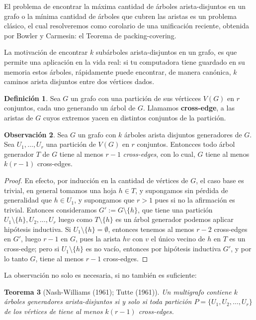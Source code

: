 \documentclass[12pt]{report}
\theoremstyle{plain}
\newtheorem{theorem}{Teorema}[section]
\theoremstyle{definition}
\newtheorem{definition}[theorem]{Definición}
\newtheorem{obs}[theorem]{Observación}
\begin{document}
El problema de encontrar la máxima cantidad de árboles arista-disjuntos en un grafo o la mínima cantidad de árboles que cubren las aristas es un problema clásico, el cual resolveremos como corolario de una unificación reciente, obtenida por Bowler y Carmesin: el Teorema de packing-covering.

La motivación de encontrar $k$ subárboles arista-disjuntos en un grafo, es que permite una aplicación en la vida real: si tu computadora tiene guardado en su memoria estos árboles, rápidamente puede encontrar, de manera canónica, $k$ caminos arista disjuntos entre dos vértices dados.

\begin{definition}
Sea $G$ un grafo con una partición de sus vérticces $V(G)$ en $r$ conjuntos, cada uno generando un árbol de $G$. Llamamos \textbf{cross-edge}, a las aristas de $G$ cuyos extremos yacen en distintos conjuntos de la partición.
\end{definition}

\begin{obs}
Sea $G$ un grafo con $k$ árboles arista disjuntos generadores de $G$. Sea $U_1, \ldots, U_r$ una partición de $V(G)$ en $r$ conjuntos. Entoncces todo árbol generador $T$ de $G$ tiene al menos $r-1$ \textit{cross-edges}, con lo cual, $G$ tiene al menos $k(r-1)$ cross-edges.
\end{obs}
\begin{proof}
En efecto, por inducción en la cantidad de vértices de $G$, el caso base es trivial, en general tomamos una hoja $h \in T$, y supongamos sin pérdida de generalidad que $h \in U_1$, y supongamos que $r >1$ pues si no la afirmación es trivial. Entonces consideramos $G' := G\setminus \{h\}$, que tiene una partición $U_1 \setminus \{h\}, U_2, \ldots, U_r$ luego como $T\setminus \{h\}$ es un árbol generador podemos aplicar hipótesis inductiva. Si $U_1 \setminus \{h\} = \emptyset$, entonces tenemos al menos $r-2$ cross-edges en $G'$, luego $r-1$ en $G$, pues la arista $hv$ con $v$ el único vecino de $h$ en $T$ es un cross-edge; pero si $U_1 \setminus \{h\}$ es no vacío, entonces por hipótesis inductiva $G'$, y por lo tanto $G$, tiene al menos $r-1$ cross-edges.
\end{proof}
La observación no solo es necesaria, si no también es suficiente:

\begin{theorem}[Nash-Williams (1961); Tutte (1961)]\label{th:Nash-williams y Tutte - todo multigrafo con $k$ arboles generadores arista disjuntos si y solo si toda particion tiene almenos k (P-1) elementos}
Un multigrafo contiene $k$ árboles generadores arista-disjuntos si y solo si toda partición $P = \{U_1,U_2,\ldots,U_r\}$ de los vértices de tiene al menos $k(r-1)$ cross-edges.
\end{theorem}
\end{document}
